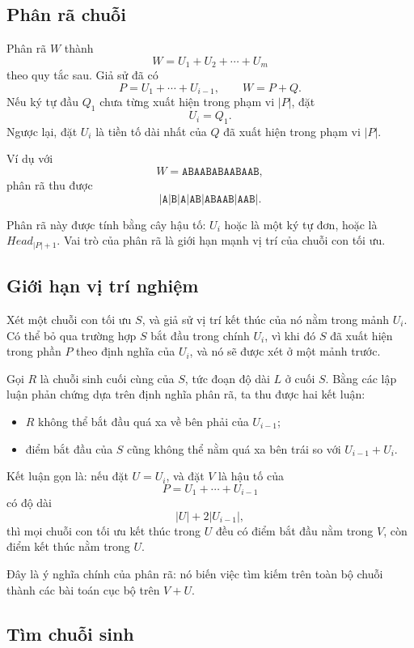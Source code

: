\documentclass[11pt]{article}
\begin{document}
\subsection{Phân rã chuỗi}

Phân rã \(W\) thành
\[
  W=U_1+U_2+\cdots+U_m
\]
theo quy tắc sau. Giả sử đã có
\[
  P=U_1+\cdots+U_{i-1},\qquad W=P+Q.
\]
Nếu ký tự đầu \(Q_1\) chưa từng xuất hiện trong phạm vi \(|P|\), đặt
\[
  U_i=Q_1.
\]
Ngược lại, đặt \(U_i\) là tiền tố dài nhất của \(Q\) đã xuất hiện trong phạm
vi \(|P|\).

Ví dụ với
\[
  W=\texttt{ABAABABAABAAB},
\]
phân rã thu được
\[
  \texttt{|A|B|A|AB|ABAAB|AAB|}.
\]

Phân rã này được tính bằng cây hậu tố: \(U_i\) hoặc là một ký tự đơn, hoặc là
\(\mathit{Head}_{|P|+1}\). Vai trò của phân rã là giới hạn mạnh vị trí của
chuỗi con tối ưu.

\subsection{Giới hạn vị trí nghiệm}

Xét một chuỗi con tối ưu \(S\), và giả sử vị trí kết thúc của nó nằm trong
mảnh \(U_i\). Có thể bỏ qua trường hợp \(S\) bắt đầu trong chính \(U_i\), vì
khi đó \(S\) đã xuất hiện trong phần \(P\) theo định nghĩa của \(U_i\), và nó
sẽ được xét ở một mảnh trước.

Gọi \(R\) là chuỗi sinh cuối cùng của \(S\), tức đoạn độ dài \(L\) ở cuối
\(S\). Bằng các lập luận phản chứng dựa trên định nghĩa phân rã, ta thu được
hai kết luận:

\begin{itemize}
  \item \(R\) không thể bắt đầu quá xa về bên phải của \(U_{i-1}\);
  \item điểm bắt đầu của \(S\) cũng không thể nằm quá xa bên trái so với
  \(U_{i-1}+U_i\).
\end{itemize}

Kết luận gọn là: nếu đặt \(U=U_i\), và đặt \(V\) là hậu tố của
\[
  P=U_1+\cdots+U_{i-1}
\]
có độ dài
\[
  |U|+2|U_{i-1}|,
\]
thì mọi chuỗi con tối ưu kết thúc trong \(U\) đều có điểm bắt đầu nằm trong
\(V\), còn điểm kết thúc nằm trong \(U\).

Đây là ý nghĩa chính của phân rã: nó biến việc tìm kiếm trên toàn bộ chuỗi
thành các bài toán cục bộ trên \(V+U\).

\subsection{Tìm chuỗi sinh}
\end{document}
